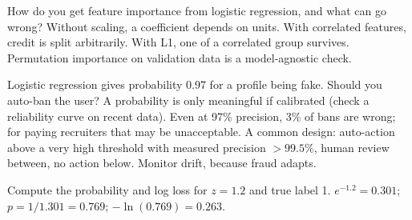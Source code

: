 \begin{qa}{How do you get feature importance from logistic regression, and what can go wrong?}
\why Without scaling, a coefficient depends on units. With correlated features, credit is split arbitrarily. With
L1, one of a correlated group survives. Permutation importance on validation data is a model-agnostic check.
\end{qa}

\begin{qa}{\deep Logistic regression gives probability 0.97 for a profile being fake. Should you auto-ban the user?}
\why A probability is only meaningful if calibrated (check a reliability curve on recent data). Even at 97\% precision,
3\% of bans are wrong; for paying recruiters that may be unacceptable. A common design: auto-action above a very high
threshold with measured precision $>99.5\%$, human review between, no action below. Monitor drift, because fraud adapts.
\end{qa}

\begin{qa}{Compute the probability and log loss for $z = 1.2$ and true label 1.}
\why $e^{-1.2} = 0.301$; $p = 1/1.301 = 0.769$; $-\ln(0.769) = 0.263$.
\end{qa}
